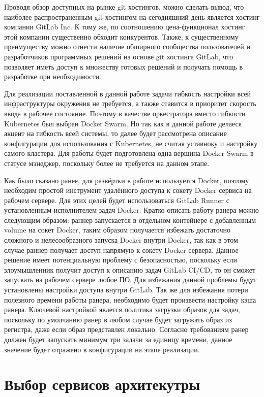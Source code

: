 Проводя обзор доступных на рынке git хостингов, можно сделать вывод, что наиболее распространенным git хостингом на сегодняшний день является хостинг компании GitLab Inc.
К тому же, по соотношению цена-функционал хостинг этой компании существенно обходит конкурентов.
Также, к существенному преимуществу можно отнести наличие обширного сообщества пользователей и разработчиков программных решений на основе git хостинга GitLab,
что позволяет иметь доступ к множеству готовых решений и получать помощь в разработке при необходимости.

Для реализации поставленной в данной работе задачи гибкость настройки всей инфраструктуры окружения не требуется, а также ставится в приоритет скорость ввода в рабочее состояние.
Поэтому в качестве оркестратора вместо гибкости Kubernetes был выбран Docker Swarm.
Но так как в данной работе делаеся акцент на гибкость всей системы, то далее будет рассмотрена описание конфигурации для использования с Kubernetes, не считая уставноку и настройку самого кластера.
Для работы будет подготовлена одна вершина Docker Swarm в статусе мэнеджер, поскольку более не требуется на данном этапе.

Как было сказано ранее, для развёртки в работе используется Docker, поэтому необходим простой инструмент удалённого доступа к сокету Docker сервиса на рабочем сервере.
Для этих целей будет использоваться GitLab Runner с установленным исполнителем задач Docker.
Кратко описать работу ранера можно следующим образом: раннер запускается в отдельном контейнере с добавленным volume на сокет Docker,
таким образом получается избежать достаточно сложного и нелесообразного запуска Docker внутри Docker,
так как в этом случае раннер получает доступ напрямую к сокету Docker сервера.
Данное решение имеет потенциальную проблему с безопасностью, поскольку если злоумышленник получит доступ к описанию задач GitLab CI/CD, то он сможет запускать на рабочем сервере любое ПО.
Для избежания данной проблемы будут установлены настройки доступа внутри GitLab.
Так же для избежания потери полезного времени работы ранера, необходимо будет произвести настройку кэша ранера.
Ключевой настройкой явлется политика загрузки образов для задач, поскольку по умолчанию ранер в любом случае будет загружать образ из регистра, даже если образ представлен локально.
Согласно требованиям ранер должен будет запускать минимум три задачи за единицу времени, данное значение будет отражено в конфигурации на этапе реализации.

\section{Выбор сервисов архитекутры}


